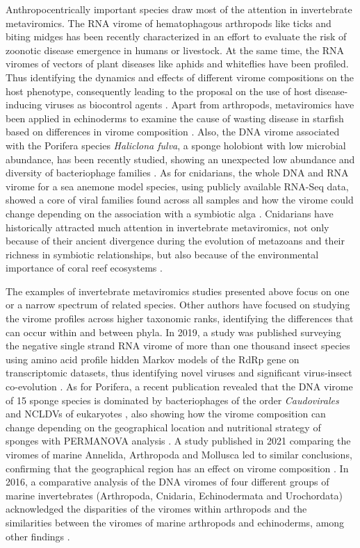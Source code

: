 \documentclass[
  openany]{book}
\begin{document}
Anthropocentrically important species draw most of the attention in invertebrate metaviromics. The RNA virome of hematophagous arthropods like ticks \autocite{Meng2019} and biting midges \autocite{Modha2019} has been recently characterized in an effort to evaluate the risk of zoonotic disease emergence in humans or livestock. At the same time, the RNA viromes of vectors of plant diseases like aphids \autocite{Kondo2020} and whiteflies \autocite{Huang2021} have been profiled. Thus identifying the dynamics and effects of different virome compositions on the host phenotype, consequently leading to the proposal on the use of host disease-inducing viruses as biocontrol agents \autocite{Feng2017}. Apart from arthropods, metaviromics have been applied in echinoderms to examine the cause of wasting disease in starfish based on differences in virome composition \autocite{Hewson2020}. Also, the DNA virome associated with the Porifera species \emph{Haliclona fulva}, a sponge holobiont with low microbial abundance, has been recently studied, showing an unexpected low abundance and diversity of bacteriophage families \autocite{Garcia-Bonilla2021}. As for cnidarians, the whole DNA and RNA virome for a sea anemone model species, using publicly available RNA-Seq data, showed a core of viral families found across all samples and how the virome could change depending on the association with a symbiotic alga \autocite{Bruwer2018}. Cnidarians have historically attracted much attention in invertebrate metaviromics, not only because of their ancient divergence during the evolution of metazoans and their richness in symbiotic relationships, but also because of the environmental importance of coral reef ecosystems \autocite{VegaThurber2008}.

The examples of invertebrate metaviromics studies presented above focus on one or a narrow spectrum of related species. Other authors have focused on studying the virome profiles across higher taxonomic ranks, identifying the differences that can occur within and between phyla. In 2019, a study was published surveying the negative single strand RNA virome of more than one thousand insect species using amino acid profile hidden Markov models of the RdRp gene on transcriptomic datasets, thus identifying novel viruses and significant virus-insect co-evolution \autocite{Kafer2019}. As for Porifera, a recent publication revealed that the DNA virome of 15 sponge species is dominated by bacteriophages of the order \emph{Caudovirales} and NCLDVs of eukaryotes , also showing how the virome composition can change depending on the geographical location and nutritional strategy of sponges with PERMANOVA analysis \autocite{Pascelli2020}. A study published in 2021 comparing the viromes of marine Annelida, Arthropoda and Mollusca led to similar conclusions, confirming that the geographical region has an effect on virome composition \autocite{Zhang2021}. In 2016, a comparative analysis of the DNA viromes of four different groups of marine invertebrates (Arthropoda, Cnidaria, Echinodermata and Urochordata) acknowledged the disparities of the viromes within arthropods and the similarities between the viromes of marine arthropods and echinoderms, among other findings \autocite{Gudenkauf2016}.
\end{document}
